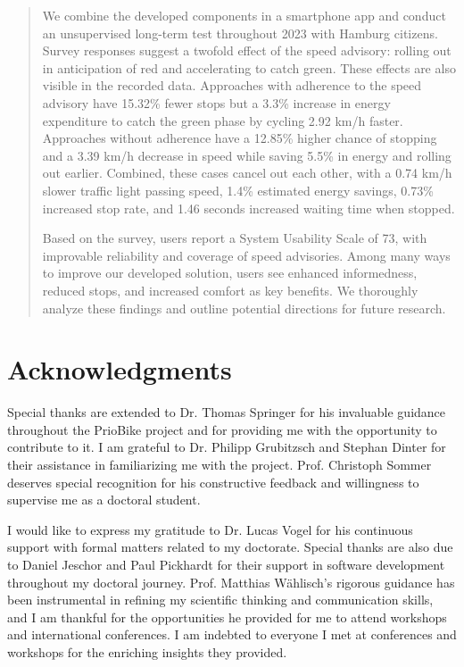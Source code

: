 \documentclass[
  ngerman,english, %
  fontsize=12pt,twoside,BCOR=6mm, %
  numbers=noenddot, %
  cd=fullcolor,
  open=right,
  headings=heavy,
  chapterpage=true,
  cdfont=off, %
  sfdefaults=false,
]{tudscrmanual}
\begin{document}
\begin{abstract}
We combine the developed components in a smartphone app and conduct an unsupervised long-term test throughout 2023 with Hamburg citizens. Survey responses suggest a twofold effect of the speed advisory: rolling out in anticipation of red and accelerating to catch green. These effects are also visible in the recorded data. Approaches with adherence to the speed advisory have 15.32\% fewer stops but a 3.3\% increase in energy expenditure to catch the green phase by cycling 2.92 km/h faster. Approaches without adherence have a 12.85\% higher chance of stopping and a 3.39 km/h decrease in speed while saving 5.5\% in energy and rolling out earlier. Combined, these cases cancel out each other, with a 0.74 km/h slower traffic light passing speed, 1.4\% estimated energy savings, 0.73\% increased stop rate, and 1.46 seconds increased waiting time when stopped.

Based on the survey, users report a System Usability Scale of 73, with improvable reliability and coverage of speed advisories. Among many ways to improve our developed solution, users see enhanced informedness, reduced stops, and increased comfort as key benefits. We thoroughly analyze these findings and outline potential directions for future research.
\end{abstract}

\newpage


\section*{Acknowledgments}

Special thanks are extended to Dr. Thomas Springer for his invaluable guidance throughout the PrioBike project and for providing me with the opportunity to contribute to it. I am grateful to Dr. Philipp Grubitzsch and Stephan Dinter for their assistance in familiarizing me with the project. Prof. Christoph Sommer deserves special recognition for his constructive feedback and willingness to supervise me as a doctoral student. 

I would like to express my gratitude to Dr. Lucas Vogel for his continuous support with formal matters related to my doctorate. Special thanks are also due to Daniel Jeschor and Paul Pickhardt for their support in software development throughout my doctoral journey. Prof. Matthias Wählisch's rigorous guidance has been instrumental in refining my scientific thinking and communication skills, and I am thankful for the opportunities he provided for me to attend workshops and international conferences. I am indebted to everyone I met at conferences and workshops for the enriching insights they provided. 
\end{document}
